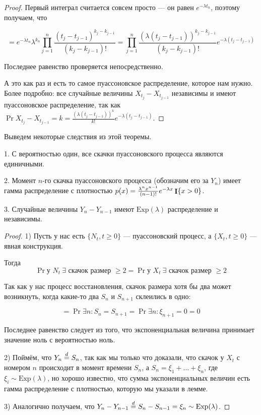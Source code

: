 \begin{proof}
  Первый интеграл считается совсем просто --- он равен $e^{-\lambda t_n}$, поэтому
  получаем, что

  \[
    = e^{-\lambda t_n} \lambda^{k_n} \prod_{j = 1}^n \frac{(t_j - t_{j - 1})^{k_j 
    - k_{j - 1}}}{(k_j - k_{j - 1})!} =
    \prod_{j = 1}^n \frac{(\lambda(t_j - t_{j - 1}))^{k_j 
    - k_{j - 1}}}{(k_j - k_{j - 1})!} e^{-\lambda (t_j - t_{j - 1})}
  \]

  Последнее равенство проверяется непосредственно.

  А это как раз и есть то самое пуассоновское распределение, которое нам
  нужно. Более подробно: все случайные величины $X_{t_j} - X_{t_{j - 1}}$ независимы
  и имеют пуассоновское распределение, так как $\Pr{X_{t_j} - X_{t_{j - 1}} = k} =
  \frac{(\lambda (t_j - t_{j - 1}))^k}{k!} e^{-\lambda (t_j - t_{j - 1})}$.
\end{proof}

Выведем некоторые следствия из этой теоремы.

\begin{lemma}
  \item[1.] С вероятностью один, все скачки пуассоновского процесса являются 
  единичными.
  \item[2.] Момент $n$-го скачка пуассоновского процесса (обозначим его за 
  $Y_n$) имеет гамма распределение с плотностью $p(x) =
  \frac{\lambda^n x^{n - 1}}{(n - 1)!}e^{-\lambda x} \mathop{\mathbf{I}}\{x > 0\}$.
  \item[3.] Случайные величины $Y_n - Y_{n - 1}$ имеют $\mathrm{Exp}(\lambda)$ 
  распределение и независимы.
\end{lemma}

\begin{proof}
  1) Пусть у нас есть $\{N_t, t \geq 0\}$ --- пуассоновский процесс, а 
  $\{X_t, t \geq 0\}$ --- явная конструкция.

  Тогда 
  \[
    \Pr{\text{у $N_t \ \exists$ скачок размер  $\geq 2$}} =
    \Pr{\text{у $X_t \ \exists$ скачок размер  $\geq 2$}} 
  \]

  Так как у нас процесс восстановления, скачок размера хотя бы два может возникнуть,
  когда какие-то два $S_n$ и $S_{n + 1}$ склеились в одно:

  \[
    = \Pr{\exists n: S_n = S_{n + 1}} = \Pr{\exists n: \xi_{n + 1} = 0} = 0
  \]

  Последнее равенство следует из того, что экспоненциальная величина принимает
  значение ноль с вероятностью ноль.

  2) Поймём, что $Y_n \overset{d}{=} S_n$, так как мы только что доказали, что скачок
  у $X_t$ с номером $n$ происходит в момент времени $S_n$, а
  $S_n = \xi_1 + \ldots + \xi_n$, где $\xi_i \sim \mathrm{Exp}(\lambda)$, но
  хорошо известно, что сумма экспоненциальных величин есть гамма распределение
  с плотностью, которую мы указали в лемме.

  3) Аналогично получаем, что $Y_n - Y_{n - 1} \overset{d}{=} S_n - S_{n - 1} = \xi_{n} \sim
  \mathrm{Exp}(\lambda)$.
\end{proof}

